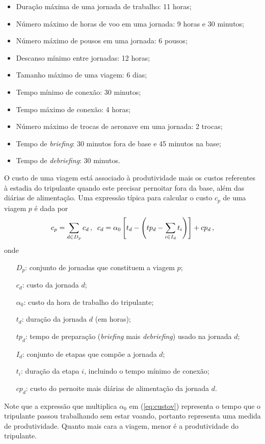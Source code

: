 \begin{itemize}
	\item Duração máxima de uma jornada de trabalho: 11 horas;
	\item Número máximo de horas de voo em uma jornada: 9 horas e 30 minutos;
	\item Número máximo de pousos em uma jornada: 6 pousos;
	\item Descanso mínimo entre jornadas: 12 horas;
	\item Tamanho máximo de uma viagem: 6 dias;
	\item Tempo mínimo de conexão: 30 minutos;
	\item Tempo máximo de conexão: 4 horas;
	\item Número máximo de trocas de aeronave em uma jornada: 2 trocas;
	\item Tempo de {\it briefing}: 30 minutos fora de base e 45 minutos na base;
	\item Tempo de {\it debriefing}: 30 minutos.
\end{itemize}

O custo de uma viagem está associado à produtividade mais os custos referentes à estadia do 
tripulante quando este precisar pernoitar fora da base, além das diárias de alimentação. Uma 
expressão típica para calcular o custo $c_p$ de uma viagem $p$ é dada por
%
\begin{equation} \label{eq:custov} 
	c_p = \sum_{d \in D_p} c_d \, , \;\;
	c_d = \alpha_0 \left[t_d - \left(tp_d - \sum_{i \in I_d} t_i\right)\right] + cp_d \, ,
\end{equation} 
%
onde
%
\begin{itemize}
	\item[$D_p$:] conjunto de jornadas que constituem a viagem $p$;
	\item[$c_d$:] custo da jornada $d$;
	\item[$\alpha_0$:] custo da hora de trabalho do tripulante;
	\item[$t_d$:] duração da jornada $d$ (em horas);	
	\item[$tp_d$:] tempo de preparação ({\it briefing} mais {\it debriefing}) usado na jornada $d$;
	\item[$I_d$:] conjunto de etapas que compõe a jornada $d$;
	\item[$t_i$:] duração da etapa $i$, incluindo o tempo mínimo de conexão;
	\item[$cp_d$:] custo do pernoite mais diárias de alimentação da jornada $d$.
\end{itemize}
%
Note que a expressão que multiplica $\alpha_0$ em (\ref{eq:custov}) representa o tempo que o
tripulante passou trabalhando sem estar voando, portanto representa uma medida de produtividade.
Quanto mais cara a viagem, menor é a produtividade do tripulante.

